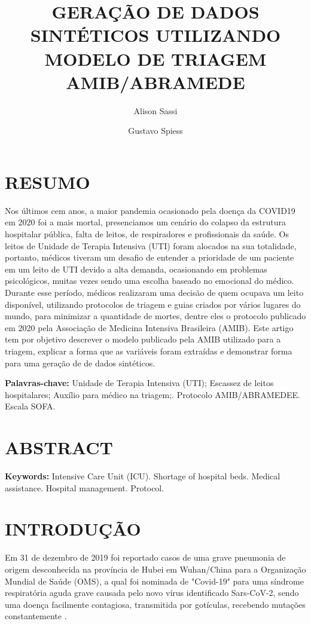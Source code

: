 \documentclass[12pt]{article}
\title{GERAÇÃO DE DADOS SINTÉTICOS UTILIZANDO MODELO DE TRIAGEM AMIB/ABRAMEDE}
\author{Alison Sassi\inst{1} \and Gustavo Spiess\inst{2} }
\begin{document}
\maketitle

\section{RESUMO}

Nos últimos cem anos, a maior pandemia ocasionado pela doença da COVID19 em 2020 foi a mais mortal, presenciamos um cenário do colapso da estrutura hospitalar pública, falta de leitos, de respiradores e profissionais da saúde. Os leitos de Unidade de Terapia Intensiva (UTI) foram alocados na sua totalidade, portanto, médicos tiveram um desafio de entender a prioridade de um paciente em um leito de UTI devido a alta demanda, ocasionando em problemas psicológicos, muitas vezes sendo uma escolha baseado no emocional do médico. Durante esse período, médicos realizaram uma decisão de quem ocupava um leito disponível, utilizando protocolos de triagem e guias criados por vários lugares do mundo, para minimizar a quantidade de mortes, dentre eles o protocolo publicado em 2020 pela Associação de Medicina Intensiva Brasileira (AMIB). Este artigo tem por objetivo descrever o modelo publicado pela AMIB utilizado para a triagem, explicar a forma que as variáveis foram extraídas e demonstrar forma para uma geração de de dados sintéticos.

\textbf{Palavras-chave:} Unidade de Terapia Intensiva (UTI); Escassez de leitos hospitalares; Auxílio para médico na triagem;. Protocolo AMIB/ABRAMEDEE. Escala SOFA.

\section{ABSTRACT} 
\textbf{Keywords:} Intensive Care Unit (ICU). Shortage of hospital beds. Medical assistance. Hospital management. Protocol.

\section{INTRODUÇÃO}

Em 31 de dezembro de 2019 foi reportado casos de uma grave pneumonia de origem desconhecida na província de Hubei em Wuhan/China para a Organização Mundial de Saúde (OMS), a qual foi nominada de "Covid-19" para uma síndrome respiratória aguda grave causada pelo novo vírus identificado Sars-CoV-2, sendo uma doença facilmente contagiosa, transmitida por gotículas, recebendo mutações constantemente \cite{sa2020especial}. 
\end{document}
